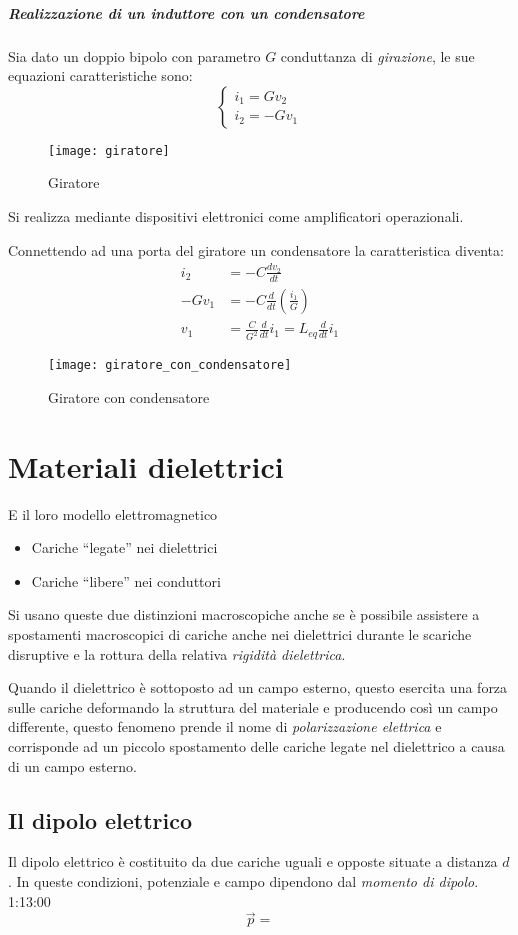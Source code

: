 \subparagraph{Realizzazione di un induttore con un condensatore}
Sia dato un doppio bipolo con parametro $G$ conduttanza di
\textit{girazione}, le sue equazioni caratteristiche sono:
$$
\begin{cases}
i_1 = G v_2\\
i_2 = -G v_1
\end{cases}
$$
\begin{figure}[h!]
\centering
\texttt{[image: giratore]}
\caption{Giratore}
\end{figure}
Si realizza mediante dispositivi elettronici come 
amplificatori operazionali.

Connettendo ad una porta del giratore un condensatore la 
caratteristica diventa:
$$
\begin{aligned}
i_2 &= -C \frac{dv_2}{dt}\\
-Gv_1 &= -C\frac{d}{dt}\left(\frac{i_1}{G}\right)\\
v_1 &= \frac{C}{G^2}\frac{d}{dt}i_1 = L_{eq} \frac{d}{dt}i_1
\end{aligned}
$$
\begin{figure}[h!]
\centering
\texttt{[image: giratore\_con\_condensatore]}
\caption{Giratore con condensatore}
\end{figure}

\section{Materiali dielettrici}
E il loro modello elettromagnetico

\begin{itemize}
 \item Cariche ``legate'' nei dielettrici
 \item Cariche ``libere'' nei conduttori
\end{itemize}
Si usano queste due distinzioni macroscopiche anche se è possibile
assistere a spostamenti macroscopici di cariche anche nei dielettrici
durante le scariche disruptive e la rottura della relativa 
\textit{rigidità dielettrica}.

Quando il dielettrico è sottoposto ad un campo esterno, questo esercita 
una forza sulle cariche deformando la struttura del materiale e 
producendo così un campo differente, questo fenomeno prende il nome
di \textit{polarizzazione elettrica} e corrisponde ad un piccolo
spostamento delle cariche legate nel dielettrico a causa di un campo
esterno.
\subsection{Il dipolo elettrico}
Il dipolo elettrico è costituito da due cariche uguali e opposte
situate a distanza $d$. In queste condizioni, potenziale e campo 
dipendono dal \textit{momento di dipolo}. 1:13:00
$$
\vec{p} = 
$$

